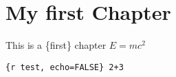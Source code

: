 \hypertarget{my-first-chapter}{%
\chapter{My first Chapter}\label{my-first-chapter}}

This is a \{\huge first\} chapter \(E=mc^2\)

\texttt{\{r\ test,\ echo=FALSE\}\ 2+3}
